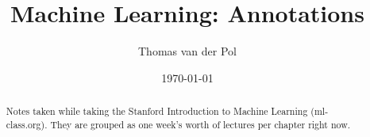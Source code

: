 \documentclass[11pt]{report}
\title{Machine Learning: Annotations}
\author{Thomas van der Pol}
\date{\today}                                           %
\begin{document}
\maketitle
\begin{abstract}
Notes taken while taking the Stanford Introduction to Machine Learning (ml-class.org). They are grouped as one week's worth of lectures per chapter right now.
\end{abstract}

\tableofcontents







\end{document}
